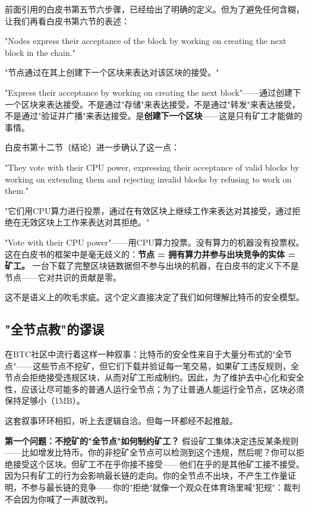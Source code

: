 \documentclass[a4paper,12pt,openany]{ctexbook}
\newenvironment{quoting}{%
  \par\vspace{0.5em}%
  \begin{list}{}{%
    \setlength{\leftmargin}{2em}%
    \setlength{\rightmargin}{2em}%
    \setlength{\parsep}{0.3em}%
    \setlength{\itemsep}{0pt}%
    \setlength{\topsep}{0pt}%
  }%
  \item\relax
}{%
  \end{list}%
  \par\vspace{0.5em}%
}
\begin{document}
前面引用的白皮书第五节六步骤，已经给出了明确的定义。但为了避免任何含糊，让我们再看白皮书第六节的表述：


\begin{quoting}
\small
"Nodes express their acceptance of the block by working on creating the next block in the chain."

"节点通过在其上创建下一个区块来表达对该区块的接受。"
\end{quoting}


"Express their acceptance by working on creating the next block"——通过创建下一个区块来表达接受。不是通过"存储"来表达接受，不是通过"转发"来表达接受，不是通过"验证并广播"来表达接受。是\textbf{创建下一个区块}——这是只有矿工才能做的事情。

白皮书第十二节（结论）进一步确认了这一点：


\begin{quoting}
\small
"They vote with their CPU power, expressing their acceptance of valid blocks by working on extending them and rejecting invalid blocks by refusing to work on them."

"它们用CPU算力进行投票，通过在有效区块上继续工作来表达对其接受，通过拒绝在无效区块上工作来表达对其拒绝。"
\end{quoting}


"Vote with their CPU power"——用CPU算力投票。没有算力的机器没有投票权。这在白皮书的框架中是毫无歧义的：\textbf{节点 = 拥有算力并参与出块竞争的实体 = 矿工。} 一台下载了完整区块链数据但不参与出块的机器，在白皮书的定义下不是节点——它对共识的贡献是零。

这不是语义上的吹毛求疵。这个定义直接决定了我们如何理解比特币的安全模型。


\subsection*{"全节点教"的谬误}


在BTC社区中流行着这样一种叙事：比特币的安全性来自于大量分布式的"全节点"——这些节点不挖矿，但它们下载并验证每一笔交易，如果矿工违反规则，全节点会拒绝接受违规区块，从而对矿工形成制约。因此，为了维护去中心化和安全性，应该让尽可能多的普通人运行全节点；为了让普通人能运行全节点，区块必须保持足够小（1MB）。

这套叙事环环相扣，听上去逻辑自洽。但每一环都经不起推敲。

\textbf{第一个问题：不挖矿的"全节点"如何制约矿工？} 假设矿工集体决定违反某条规则——比如增发比特币。你的非挖矿全节点可以检测到这个违规，然后呢？你可以拒绝接受这个区块。但矿工不在乎你接不接受——他们在乎的是其他矿工接不接受。因为只有矿工的行为会影响最长链的走向。你的全节点不出块，不产生工作量证明，不参与最长链的竞争——你的"拒绝"就像一个观众在体育场里喊"犯规"：裁判不会因为你喊了一声就改判。
\end{document}
